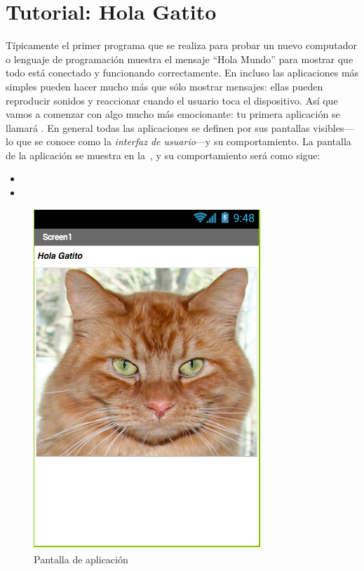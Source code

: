 \documentclass[letterpaper]{article}
\begin{document}
\tableofcontents

\clearpage

\section{Tutorial: Hola Gatito}
\label{sec:tutor-hola-gatito}

Típicamente el primer programa que se realiza para probar un nuevo
computador o lenguaje de programación muestra el mensaje ``Hola
Mundo'' para mostrar que todo está conectado y funcionando
correctamente. En \AppInventor incluso las aplicaciones más simples
pueden hacer mucho más que sólo mostrar mensajes: ellas pueden
reproducir sonidos y reaccionar cuando el usuario toca el
dispositivo. Así que vamos a comenzar con algo mucho más emocionante:
tu primera aplicación se llamará . En general
todas las aplicaciones se definen por sus pantallas visibles---lo que
se conoce como la \textit{interfaz de usuario}---y su
comportamiento. La pantalla de la aplicación se muestra en
la~, y su comportamiento será como sigue:

\begin{itemize}
\item {}
\item {}
\end{itemize}

\begin{figure}[H]
\centering
\includegraphics[scale=0.3]{figures/HolaGatito}
\caption{Pantalla de aplicación }
\label{fig:holaGatito}
\end{figure}
\end{document}
